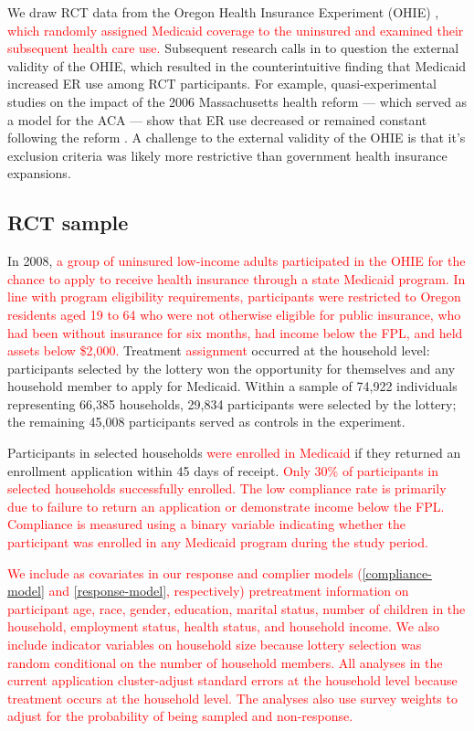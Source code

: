 \documentclass[hidelinks,12pt]{article}
\begin{document}
We draw RCT data from the Oregon Health Insurance Experiment (OHIE) \citep{finkelstein2012,Taubman}, \textcolor{red}{which randomly assigned Medicaid coverage to the uninsured and examined their subsequent health care use.} Subsequent research calls in to question the external validity of the OHIE, which resulted in the counterintuitive finding that Medicaid increased ER use among RCT participants. For example, quasi-experimental studies on the impact of the 2006 Massachusetts health reform --- which served as a model for the ACA --- show that ER use decreased or remained constant following the reform \citep{miller2012effect, kolstad2012impact}. A challenge to the external validity of the OHIE is that it's exclusion criteria was likely more restrictive than government health insurance expansions. 

\subsection{RCT sample} 

In 2008, \textcolor{red}{a group of uninsured low-income adults participated in the OHIE for the chance to apply to receive health insurance through a state Medicaid program. In line with program eligibility requirements, participants were restricted to Oregon residents aged 19 to 64 who were not otherwise eligible for public insurance, who had been without insurance for six months, had income below the FPL, and held assets below \$2,000.} Treatment \textcolor{red}{assignment} occurred at the household level: participants selected by the lottery won the opportunity for themselves and any household member to apply for Medicaid. Within a sample of 74,922 individuals representing 66,385 households, 29,834 participants were selected by the lottery; the remaining 45,008 participants served as controls in the experiment. 

Participants in selected households \textcolor{red}{were enrolled in Medicaid} if they returned an enrollment application within 45 days of receipt. \textcolor{red}{Only 30\% of participants in selected households successfully enrolled. The low compliance rate is primarily due to failure to return an application or demonstrate income below the FPL. Compliance is measured using a binary variable indicating whether the participant was enrolled in any Medicaid program during the study period.}

\textcolor{red}{We include as covariates in our response and complier models (\ref{compliance-model} and \ref{response-model}, respectively) pretreatment information on participant age, race, gender, education, marital status, number of children in the household, employment status, health status, and household income. We also include indicator variables on household size because lottery selection was random conditional on the number of household members. All analyses in the current application cluster-adjust standard errors at the household level because treatment occurs at the household level. The analyses also use survey weights to adjust for the probability of being sampled and non-response.} 
\end{document}
